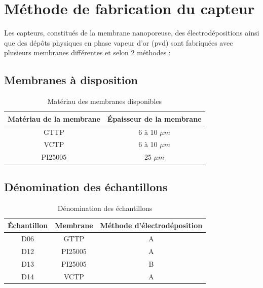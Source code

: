 \section{Méthode de fabrication du capteur}
\label{chap:capteur}
Les capteurs, constitués de la membrane nanoporeuse, des électrodépositions ainsi que des dépôts physiques en phase vapeur d'or (\gls{pvd}) sont 
fabriquées avec plusieurs membranes différentes et selon 2 méthodes :

\subsection{Membranes à disposition}
\begin{table}[H]
    \centering
    \begin{tabular}{|c|c|}
        \hline
        Matériau de la membrane & Épaisseur de la membrane \\
        \hline
        GTTP                    & 6 à 10 $\mu m$           \\
        \hline
        VCTP                    & 6 à 10 $\mu m$           \\
        \hline
        PI25005                 & 25 $\mu m$               \\
        \hline
    \end{tabular}
    \caption{Matériau des membranes disponibles}
    \label{tab:membranes}
\end{table}

\subsection{Dénomination des échantillons}
\begin{table}[H]
    \centering
    \begin{tabular}{|c|c|c|}
        \hline
        Échantillon & Membrane & Méthode d'électrodéposition \\
        \hline
        D06         & GTTP     & A                           \\
        \hline
        D12         & PI25005  & A                           \\
        \hline
        D13         & PI25005  & B                           \\
        \hline
        D14         & VCTP     & A                           \\
        \hline
    \end{tabular}
    \caption{Dénomination des échantillons}
\end{table}

